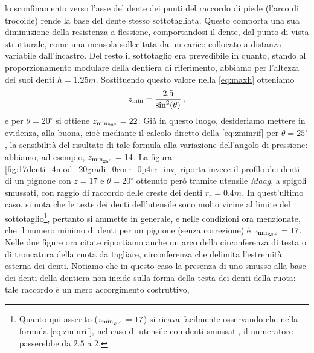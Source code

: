 lo sconfinamento verso l'asse del dente dei
 punti del raccordo di piede (l'arco di trocoide) rende la base del 
dente stesso sottotagliata. Questo comporta una sua diminuzione della
resistenza a flessione, comportandosi il dente, dal punto di vista
strutturale, come una mensola
sollecitata da un carico collocato a distanza variabile dall'incastro.
 Del resto il sottotaglio era prevedibile in quanto,
 stando al proporzionamento modulare della dentiera di riferimento,
abbiamo per l'altezza dei suoi denti $h=1.25 m$.  Sostituendo questo valore nella
\ref{eq:maxh} otteniamo
\begin{equation}
z_{\rm min}=\frac{2.5}{\sin^2(\theta)}\,,
\label{eq:zminrif}
\end{equation}
\noindent e per $\theta= 20^{\circ}$ si  ottiene
$z_{{\rm min}_{20^{\circ}}}=22$. Gi\`a in questo luogo, desideriamo
mettere in evidenza, alla buona, cio\`e mediante il calcolo
diretto della \ref{eq:zminrif} per
$\theta=25^{\circ}$, la sensibilit\`a del risultato di
 tale formula alla variazione dell'angolo di 
pressione: abbiamo, ad esempio, $z_{{\rm min}_{25^{\circ}}}=14$. La figura
\ref{fig:17denti_4mod_20gradi_0corr_0p4rr_inv} riporta invece il
profilo dei denti di un pignone con $z=17$ e $\theta = 20^{\circ}$ ottenuto per\`o
tramite utensile {\em Maag}, a spigoli smussati, con raggio di raccordo delle creste
dei denti $r_r=0.4m$.
In quest'ultimo caso, si nota che le teste dei denti
dell'utensile sono molto vicine al limite del sottotaglio\footnote{
Quanto qui asserito ($z_{{\rm min}_{20^{\circ}}}=17$) si ricava facilmente
osservando che nella formula \ref{eq:zminrif}, nel caso di utensile con denti
 smussati, il numeratore passerebbe da $2.5$ a $2$.
},
pertanto si ammette in generale,
e nelle condizioni ora menzionate, che il numero minimo  di denti per
un pignone (senza correzione) \`e $z_{{\rm min}_{20^{\circ}}}=17$.
Nelle due figure ora citate riportiamo anche un arco della circonferenza di
testa o di troncatura della ruota da tagliare, circonferenza che delimita
l'estremit\`a esterna dei denti.
Notiamo che in questo caso
la presenza di uno smusso alla base dei denti della dentiera non
incide sulla forma della testa dei denti della ruota:
 tale raccordo \`e un mero accorgimento costruttivo,
